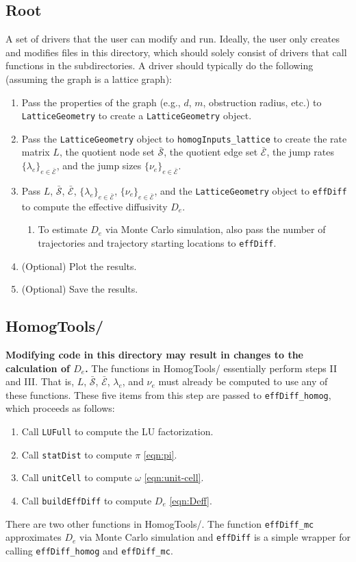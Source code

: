 \documentclass[11pt, oneside]{article}   	%
\theoremstyle{definition}
\newcommand\sS{\mathcal{S}}
\newcommand\sE{\mathcal{E}}
\newcommand\oS{\bar{\sS}}
\newcommand\oE{\bar{\sE}}
\begin{document}
\subsection{Root}
A set of drivers that the user can modify and run. Ideally, the user only creates and modifies files in this directory, which should solely consist of drivers that call functions in the subdirectories. A driver should typically do the following (assuming the graph is a lattice graph):
\begin{enumerate}
	\item Pass the properties of the graph (e.g., $d$, $m$, obstruction radius, etc.) to \texttt{LatticeGeometry} to create a \texttt{LatticeGeometry} object.
	\item Pass the \texttt{LatticeGeometry} object to \texttt{homogInputs\_lattice} to create the rate matrix $L$, the quotient node set $\oS$, the quotient edge set $\oE$, the jump rates $\{\lambda_e\}_{e \in \oE}$, and the jump sizes $\{\nu_e\}_{e \in \oE}$.
	\item Pass $L$, $\oS$, $\oE$, $\{\lambda_e\}_{e \in \oE}$, $\{\nu_e\}_{e \in \oE}$, and the \texttt{LatticeGeometry} object to \texttt{effDiff} to compute the effective diffusivity $D_e$.
	\begin{enumerate}
		\item To estimate $D_e$ via Monte Carlo simulation, also pass the number of trajectories and trajectory starting locations to \texttt{effDiff}.
	\end{enumerate}
	\item (Optional) Plot the results.
	\item (Optional) Save the results.
\end{enumerate}

\subsection{HomogTools/}
{\bf Modifying code in this directory may result in changes to the calculation of $D_e$.} The functions in HomogTools/ essentially perform steps II and III. That is, $L$, $\oS$, $\oE$, $\lambda_e$, and $\nu_e$ must already be computed to use any of these functions. These five items from this step are passed to \texttt{effDiff\_homog}, which proceeds as follows:
\begin{enumerate}
	\item Call \texttt{LUFull} to compute the LU factorization.
	\item Call \texttt{statDist} to compute $\pi$ \eqref{eqn:pi}.
	\item Call \texttt{unitCell} to compute $\omega$ \eqref{eqn:unit-cell}.
	\item Call \texttt{buildEffDiff} to compute $D_e$ \eqref{eqn:Deff}.
\end{enumerate}
There are two other functions in HomogTools/. The function \texttt{effDiff\_mc} approximates $D_e$ via Monte Carlo simulation and \texttt{effDiff} is a simple wrapper for calling \texttt{effDiff\_homog} and \texttt{effDiff\_mc}.
\end{document}
